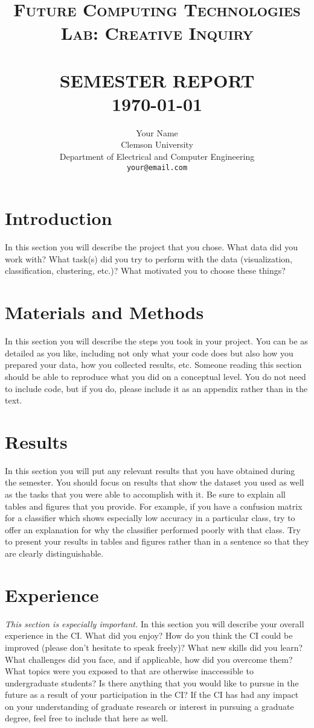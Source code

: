 \documentclass[paper=a4, fontsize=11pt,twoside]{scrartcl}
\title{
    \normalsize \textsc{Future Computing Technologies Lab: Creative Inquiry} \\ [2.0cm]
	\HRule{0.5pt} \\
	\LARGE \textbf{\uppercase{Semester Report}}
	\HRule{2pt} \\ [0.5cm]
	\normalsize \today
}
\author{
	Your Name\\	
	Clemson University\\	
	Department of Electrical and Computer Engineering\\
	\texttt{your@email.com} \\
}
\makeatletter
\def\printtitle{
	{\centering \@title\par}}
\def\printauthor{
	{\centering \large \@author}}
\makeatother
\begin{document}
\thispagestyle{empty}

\printtitle
\vfill
\printauthor
\newpage

\setcounter{page}{1}

\section{Introduction}

In this section you will describe the project that you chose. What data did you work with? What task(s) did you try to perform with the data (visualization, classification, clustering, etc.)? What motivated you to choose these things?

\section{Materials and Methods}

In this section you will describe the steps you took in your project. You can be as detailed as you like, including not only what your code does but also how you prepared your data, how you collected results, etc. Someone reading this section should be able to reproduce what you did on a conceptual level. You do not need to include code, but if you do, please include it as an appendix rather than in the text.

\section{Results}

In this section you will put any relevant results that you have obtained during the semester. You should focus on results that show the dataset you used as well as the tasks that you were able to accomplish with it. Be sure to explain all tables and figures that you provide. For example, if you have a confusion matrix for a classifier which shows especially low accuracy in a particular class, try to offer an explanation for why the classifier performed poorly with that class. Try to present your results in tables and figures rather than in a sentence so that they are clearly distinguishable.

\section{Experience}

\textit{This section is especially important.} In this section you will describe your overall experience in the CI. What did you enjoy? How do you think the CI could be improved (please don't hesitate to speak freely)? What new skills did you learn? What challenges did you face, and if applicable, how did you overcome them? What topics were you exposed to that are otherwise inaccessible to undergraduate students? Is there anything that you would like to pursue in the future as a result of your participation in the CI? If the CI has had any impact on your understanding of graduate research or interest in pursuing a graduate degree, feel free to include that here as well.
\end{document}
